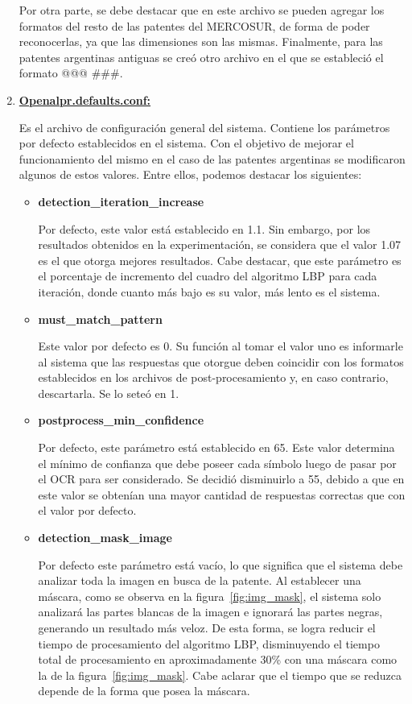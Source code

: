 \begin{enumerate}
	Por otra parte, se debe destacar que en este archivo se pueden agregar los formatos del resto de las patentes del MERCOSUR, de forma de poder reconocerlas, ya que las dimensiones son las mismas. Finalmente, para las patentes argentinas antiguas se creó otro archivo en el que se estableció el formato @@@ \#\#\#.
	
	\item \textbf{\underline{Openalpr.defaults.conf:}}
	
	Es el archivo de configuración general del sistema. Contiene los parámetros por defecto establecidos en el sistema. Con el objetivo de mejorar el funcionamiento del mismo en el caso de las patentes argentinas se modificaron algunos de estos valores. Entre ellos, podemos destacar los siguientes:
	\begin{itemize}
		\item \textbf{detection\_iteration\_increase}
		
		Por defecto, este valor está establecido en 1.1.  Sin embargo, por los resultados obtenidos en la experimentación, se considera que el valor 1.07 es el que otorga mejores resultados. Cabe destacar, que este parámetro es el porcentaje de incremento del cuadro del algoritmo LBP para cada iteración, donde cuanto más bajo es su valor, más lento es el sistema.
		
		\item \textbf{must\_match\_pattern}	
		
		Este valor por defecto es 0. Su función al tomar el valor uno es informarle al sistema que las respuestas que otorgue deben coincidir con los formatos establecidos en los archivos de post-procesamiento y, en caso contrario, descartarla. Se lo seteó en 1.
		
		\item \textbf{postprocess\_min\_confidence}	
		
		Por defecto, este parámetro está establecido en 65. Este valor determina el mínimo de confianza que debe poseer cada símbolo luego de pasar por el OCR para ser considerado. Se decidió disminuirlo a 55, debido a que en este valor se obtenían una mayor cantidad de respuestas correctas que con el valor por defecto.
		
		\item \textbf{detection\_mask\_image}	
		
		Por defecto este parámetro está vacío, lo que significa que el sistema debe analizar toda la imagen en busca de la patente. Al establecer una máscara, como se observa en la figura~\ref{fig:img_mask}, el sistema solo analizará las partes blancas de la imagen e ignorará las partes negras, generando un resultado más veloz. De esta forma, se logra reducir el tiempo de procesamiento del algoritmo LBP, disminuyendo el tiempo total de procesamiento en aproximadamente 30\% con una máscara como la de la figura~\ref{fig:img_mask}. Cabe aclarar que el tiempo que se reduzca depende de la forma que posea la máscara.
		

\end{itemize}
\end{enumerate}

